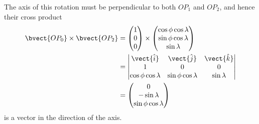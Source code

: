 \begin{enumerate}
          The axis of this rotation must be perpendicular to both \(O P_1\) and \(O P_2\), and hence their cross product
          \begin{align*}
              \bvect{O P_0} \times \bvect{O P_2} & = \begin{pmatrix}
                                                         1 \\
                                                         0 \\
                                                         0
                                                     \end{pmatrix} \times \begin{pmatrix}
                                                                              \cos \phi \cos \lambda \\
                                                                              \sin \phi \cos \lambda \\
                                                                              \sin \lambda
                                                                          \end{pmatrix}                                                                \\
                                                 & = \begin{vmatrix}
                                                         \vect{\hat{i}}         & \vect{\hat{j}}         & \vect{\hat{k}} \\
                                                         1                      & 0                      & 0              \\
                                                         \cos \phi \cos \lambda & \sin \phi \cos \lambda & \sin \lambda
                                                     \end{vmatrix} \\
                                                 & = \begin{pmatrix}
                                                         0              \\
                                                         - \sin \lambda \\
                                                         \sin \phi \cos \lambda
                                                     \end{pmatrix}
          \end{align*}
          is a vector in the direction of the axis.
\end{enumerate}